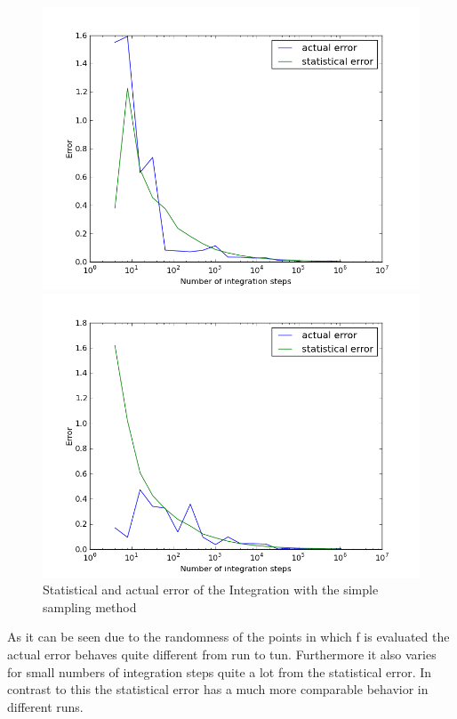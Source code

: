 \documentclass[12pt,a4paper]{scrartcl}
\begin{document}
 \begin{figure}[H]
\centering
\includegraphics[width=16.0cm]{../plots/Error2.png}

\includegraphics[width=16.0cm]{../plots/Error3.png}
\caption{Statistical and actual error of the Integration with the simple sampling method}
\label{fig:error1}
\end{figure}

As it can be seen due to the randomness of the points in which f is evaluated the actual error behaves quite different from run to tun. Furthermore it also varies for small numbers of integration steps quite a lot from the statistical error. In contrast to this the statistical error has a much more comparable behavior in different runs.
\end{document}
